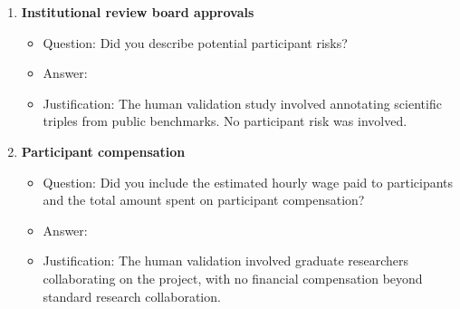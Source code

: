 \documentclass{article}
\begin{document}
\begin{enumerate}
\item {\bf Institutional review board approvals}
\begin{itemize}
\item[] Question: Did you describe potential participant risks?
\item[] Answer: \answerNA{}
\item[] Justification: The human validation study involved annotating scientific triples from public benchmarks. No participant risk was involved.
\end{itemize}

\item {\bf Participant compensation}
\begin{itemize}
\item[] Question: Did you include the estimated hourly wage paid to participants and the total amount spent on participant compensation?
\item[] Answer: \answerNA{}
\item[] Justification: The human validation involved graduate researchers collaborating on the project, with no financial compensation beyond standard research collaboration.
\end{itemize}

\end{enumerate}
\end{document}
